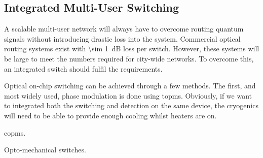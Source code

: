\subsection{Integrated Multi-User Switching}

A scalable multi-user network will always have to overcome routing quantum signals without introducing drastic loss into the system. Commercial optical routing systems exist with \SI{\sim 1}{dB} loss per switch. However, these systems will be large to meet the numbers required for city-wide networks. To overcome this, an integrated switch should fulfil the requirements. 

Optical on-chip switching can be achieved through a few methods. The first, and most widely used, phase modulation is done using \acp{topm}. Obviously, if we want to integrated both the switching and detection on the same device, the cryogenics will need to be able to provide enough cooling whilst heaters are on.

\acp{eopm}.

Opto-mechanical switches.

